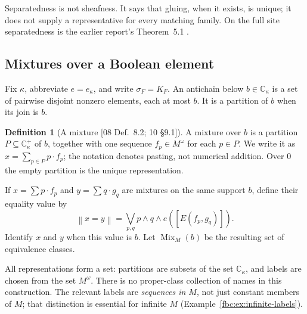 \documentclass[11pt,letterpaper]{article}
\theoremstyle{definition}
\newtheorem{definition}[theorem]{Definition}
\theoremstyle{remark}
\newcommand{\om}{\omega}
\newcommand{\C}{\mathbb C}
\newcommand{\Mix}{\operatorname{Mix}}
\newcommand{\eqset}[2]{E(#1,#2)}
\newcommand{\truth}[1]{\left\lVert #1\right\rVert}
\newcommand{\src}[1]{\textup{[#1]}}
\begin{document}
Separatedness is not sheafness. It says that gluing, when it exists,
is unique; it does not supply a representative for every matching
family. On the full site separatedness is the earlier report's
Theorem~5.1 \cite{Repo}.

\subsection{Mixtures over a Boolean element}
Fix $\kappa$, abbreviate $e=e_\kappa$, and write $\sigma_F=K_F$. An
antichain below $b\in\C_\kappa$ is a set of pairwise disjoint nonzero
elements, each at most $b$. It is a partition of $b$ when its join is
$b$.

\begin{definition}[A mixture \src{08 Def.~8.2; 10 \S9.1}]\label{fbc:def:mixture}
A mixture over $b$ is a partition $P\subseteq\C_\kappa^+$ of $b$,
together with one sequence $f_p\in M^\om$ for each $p\in P$.
We write it as $x=\sum_{p\in P}p\cdot f_p$; the notation denotes
pasting, not numerical addition. Over $0$ the empty partition is
the unique representation.

If $x=\sum p\cdot f_p$ and $y=\sum q\cdot g_q$ are mixtures
on the same support $b$, define their equality value by
\begin{equation}\label{fbc:eq:mix-equality}
 \truth{x=y}=\bigvee_{p,q}
       p\wedge q\wedge e([\eqset{f_p}{g_q}]).
\end{equation}
Identify $x$ and $y$ when this value is $b$. Let $\Mix_M(b)$
be the resulting set of equivalence classes.
\end{definition}

All representations form a set: partitions are subsets of the set
$\C_\kappa$, and labels are chosen from the set $M^\om$. There is no
proper-class collection of names in this construction. The relevant
labels are \emph{sequences in $M$}, not just constant members of $M$;
that distinction is essential for infinite $M$
(Example~\ref{fbc:ex:infinite-labels}).
\end{document}

